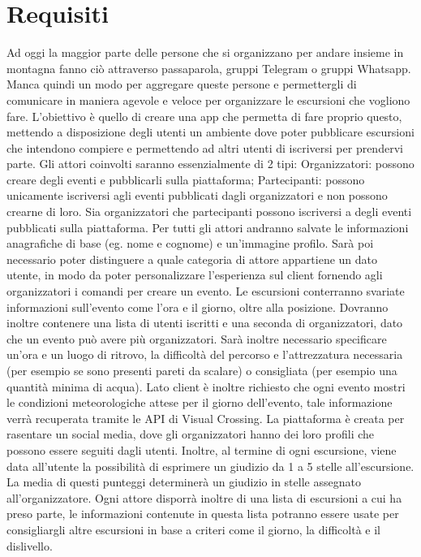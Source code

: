 \section{Requisiti}
Ad oggi la maggior parte delle persone che si organizzano per andare insieme in montagna fanno ciò attraverso passaparola, gruppi Telegram o gruppi Whatsapp. Manca quindi un modo per aggregare queste persone e permettergli di comunicare in maniera agevole e veloce per organizzare le escursioni che vogliono fare.
L'obiettivo è quello di creare una app che permetta di fare proprio questo, mettendo a disposizione degli utenti un ambiente dove poter pubblicare escursioni che intendono compiere e permettendo ad altri utenti di iscriversi per prendervi parte.
Gli attori coinvolti saranno essenzialmente di 2 tipi:
Organizzatori: possono creare degli eventi e pubblicarli sulla piattaforma;
Partecipanti: possono unicamente iscriversi agli eventi pubblicati dagli organizzatori e non possono crearne di loro. Sia organizzatori che partecipanti possono iscriversi a degli eventi pubblicati sulla piattaforma.
Per tutti gli attori andranno salvate le informazioni anagrafiche di base (eg. nome e cognome) e un'immagine profilo. Sarà poi necessario poter distinguere a quale categoria di attore appartiene un dato utente, in modo da poter personalizzare l’esperienza sul client fornendo agli organizzatori i comandi per creare un evento.
Le escursioni conterranno svariate informazioni sull’evento come l’ora e il giorno, oltre alla posizione. Dovranno inoltre contenere una lista di utenti iscritti e una seconda di organizzatori, dato che un evento può avere più organizzatori. Sarà inoltre necessario specificare un’ora e un luogo di ritrovo, la difficoltà del percorso e l’attrezzatura necessaria (per esempio se sono presenti pareti da scalare) o consigliata (per esempio una quantità minima di acqua). Lato client è inoltre richiesto che ogni evento mostri le condizioni meteorologiche attese per il giorno dell’evento, tale informazione verrà recuperata tramite le API di Visual Crossing.
La piattaforma è creata per rasentare un social media, dove gli organizzatori hanno dei loro profili che possono essere seguiti dagli utenti. Inoltre, al termine di ogni escursione, viene data all’utente la possibilità di esprimere un giudizio da 1 a 5 stelle all’escursione. La media di questi punteggi determinerà un giudizio in stelle assegnato all’organizzatore.
Ogni attore disporrà inoltre di una lista di escursioni a cui ha preso parte, le informazioni contenute in questa lista potranno essere usate per consigliargli altre escursioni in base a criteri come il giorno, la difficoltà e il dislivello.
